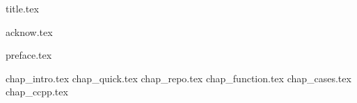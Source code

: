\documentclass[12pt,letterpaper,oneside]{scrbook}
\begin{document}
\frontmatter
{title.tex}

\clearpage
\thispagestyle{empty}
{acknow.tex}
 
\tableofcontents

{preface.tex}

\mainmatter

{chap_intro.tex}
{chap_quick.tex}
{chap_repo.tex}
{chap_function.tex}
{chap_cases.tex}
{chap_ccpp.tex}
\backmatter
\end{document}
